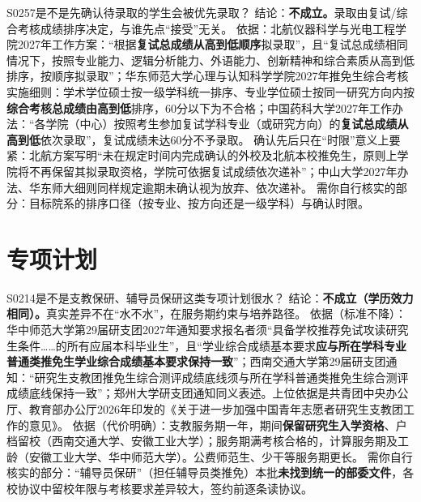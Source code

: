 \begin{qa}{S0257}{是不是先确认待录取的学生会被优先录取？}
结论：\textbf{不成立。}录取由复试/综合考核成绩排序决定，与谁先点“接受”无关。
依据：北航仪器科学与光电工程学院2027年工作方案：“根据\textbf{复试总成绩从高到低顺序}拟录取”，且“复试总成绩相同情况下，按照专业能力、逻辑分析能力、外语能力、创新精神和综合素质从高到低排序，按顺序拟录取”；华东师范大学心理与认知科学学院2027年推免生综合考核实施细则：学术学位硕士按一级学科统一排序、专业学位硕士按同一研究方向内按\textbf{综合考核总成绩由高到低}排序，60分以下为不合格；中国药科大学2027年工作办法：“各学院（中心）按照考生参加复试学科专业（或研究方向）的\textbf{复试总成绩从高到低}依次录取”，复试成绩未达60分不予录取。
确认先后只在“时限”意义上要紧：北航方案写明“未在规定时间内完成确认的外校及北航本校推免生，原则上学院将不再保留其拟录取资格，学院可依据复试成绩依次递补”；中山大学2027年办法、华东师大细则同样规定逾期未确认视为放弃、依次递补。
需你自行核实的部分：目标院系的排序口径（按专业、按方向还是一级学科）与确认时限。
\end{qa}

\section{专项计划}
\begin{qa}{S0214}{是不是支教保研、辅导员保研这类专项计划很水？}
结论：\textbf{不成立（学历效力相同）。}真实差异不在“水不水”，在服务期约束与培养路径。
依据（标准不降）：华中师范大学第29届研支团2027年通知要求报名者须“具备学校推荐免试攻读研究生条件……的所有应届本科毕业生”，且“学业综合成绩基本要求\textbf{应与所在学科专业普通类推免生学业综合成绩基本要求保持一致}”；西南交通大学第29届研支团通知：“研究生支教团推免生综合测评成绩底线须与所在学科普通类推免生综合测评成绩底线保持一致”；郑州大学研支团通知同义表述。上位依据是共青团中央办公厅、教育部办公厅2026年印发的《关于进一步加强中国青年志愿者研究生支教团工作的意见》。
依据（代价明确）：支教服务期一年，期间\textbf{保留研究生入学资格}、户档留校（西南交通大学、安徽工业大学）；服务期满考核合格的，计算服务期及工龄（安徽工业大学、华中师范大学）。公费师范生、少干等服务期更长。
需你自行核实的部分：“辅导员保研”（担任辅导员类推免）本批\textbf{未找到统一的部委文件}，各校协议中留校年限与考核要求差异较大，签约前逐条读协议。
\end{qa}

